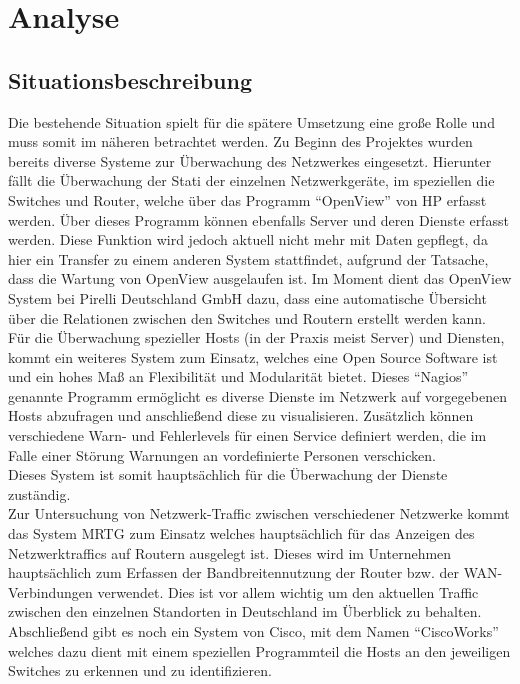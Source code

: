\chapter{Analyse}
\label{cha:analyse}

\section{Situationsbeschreibung}
\label{sec:situation}

Die bestehende Situation spielt für die spätere Umsetzung eine große Rolle und muss somit im näheren betrachtet werden.
Zu Beginn des Projektes wurden bereits diverse Systeme zur Überwachung des Netzwerkes eingesetzt. Hierunter fällt die Überwachung der Stati der einzelnen Netzwerkgeräte, im speziellen die Switches und Router, welche über das Programm “OpenView” von HP erfasst werden. Über dieses Programm können ebenfalls Server und deren Dienste erfasst werden. Diese Funktion wird jedoch aktuell nicht mehr mit Daten gepflegt, da hier ein Transfer zu einem anderen System stattfindet, aufgrund der Tatsache, dass die Wartung von OpenView ausgelaufen ist. Im Moment dient das OpenView System bei Pirelli Deutschland GmbH dazu, dass eine automatische Übersicht über die Relationen zwischen den Switches und Routern erstellt werden kann.\\
Für die Überwachung spezieller Hosts (in der Praxis meist Server) und Diensten, kommt ein weiteres System zum Einsatz, welches eine Open Source Software ist und ein hohes Maß an Flexibilität und Modularität bietet. Dieses “Nagios” genannte Programm ermöglicht es diverse Dienste im Netzwerk auf vorgegebenen Hosts abzufragen und anschließend diese zu visualisieren. Zusätzlich können verschiedene Warn- und Fehlerlevels für einen Service definiert werden, die im Falle einer Störung Warnungen an vordefinierte Personen verschicken.\\
Dieses System ist somit hauptsächlich für die Überwachung der Dienste zuständig.\\
Zur Untersuchung von Netzwerk-Traffic zwischen verschiedener Netzwerke kommt das System MRTG zum Einsatz welches hauptsächlich für das Anzeigen des Netzwerktraffics auf Routern ausgelegt ist.
Dieses wird im Unternehmen hauptsächlich zum Erfassen der Bandbreitennutzung der Router bzw. der WAN-Verbindungen verwendet.
Dies ist vor allem wichtig um den aktuellen Traffic zwischen den einzelnen Standorten in Deutschland im Überblick zu behalten.\\
Abschließend gibt es noch ein System von Cisco, mit dem Namen “CiscoWorks” welches dazu dient mit einem speziellen Programmteil die Hosts an den jeweiligen Switches zu erkennen und zu identifizieren.
